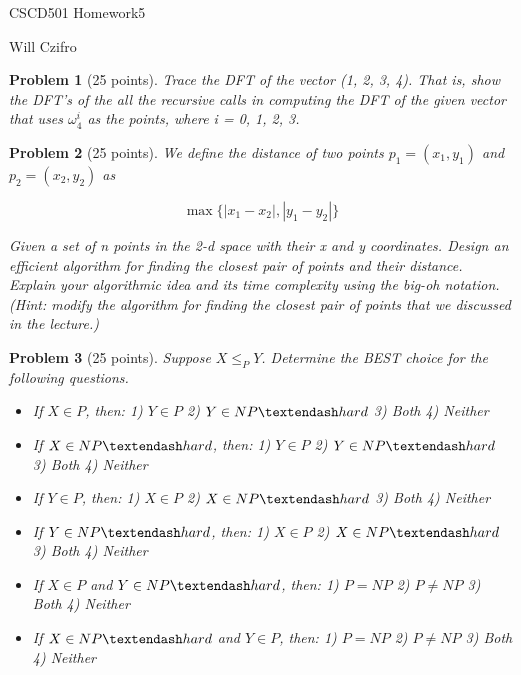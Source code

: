 \documentclass[11pt]{article}
\newtheorem{problem}{Problem}
\begin{document}
\begin{center}
  {\LARGE CSCD501 Homework5}

\bigskip 

{\Large Will Czifro}

\end{center}

\bigskip 

\begin{problem}[25 points]
\label{prob:1}
Trace the DFT of the vector (1, 2, 3, 4). That is, show the DFT’s of the all the recursive calls
in computing the DFT of the given vector that uses $\omega_4^i$ as the points, where i = 0, 1, 2, 3.
\end{problem}




\begin{problem}[25 points]
\label{prob:2}
We define the distance of two points $p_1 = (x_1, y_1)$ and $p_2 = (x_2, y_2)$ as

$$
\max{\{|x_1 - x_2|,|y_1 - y_2|\}}
$$

Given a set of n points in the 2-d space with their x and y coordinates. Design an efficient algorithm for finding
the closest pair of points and their distance. Explain your algorithmic idea and its time complexity using the big-oh
notation. (Hint: modify the algorithm for finding the closest pair of points that we discussed in the lecture.)
\end{problem}




\begin{problem}[25 points]
\label{prob:3}
Suppose $X \leq_P Y$. Determine the BEST choice for the following questions.
\begin{itemize}
\item If $X \in P$, then: 1) $Y \in P$ 2) $Y \in NP\textendash hard$ 3) Both 4) Neither
\item If $X \in NP\textendash hard$, then: 1) $Y \in P$ 2) $Y \in NP\textendash hard$ 3) Both 4) Neither
\item If $Y \in P$, then: 1) $X \in P$ 2) $X \in NP\textendash hard$ 3) Both 4) Neither
\item If $Y \in NP\textendash hard$, then: 1) $X \in P$ 2) $X \in NP\textendash hard$ 3) Both 4) Neither
\item If $X \in P$ and $Y \in NP\textendash hard$, then: 1) $P = NP$ 2) $P \neq NP$ 3) Both 4) Neither
\item If $X \in NP\textendash hard$ and $Y \in P$, then: 1) $P = NP$ 2) $P \neq NP$ 3) Both 4) Neither
\end{itemize}
\end{problem}
\end{document}

